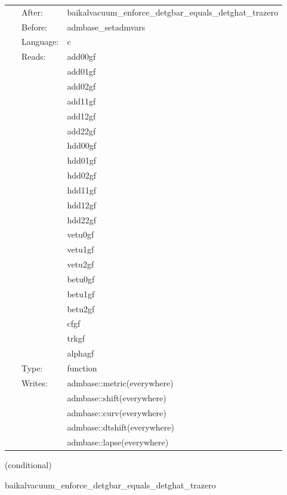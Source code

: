  \begin{tabular*}{160mm}{cll} 
~ & After:  & baikalvacuum\_enforce\_detgbar\_equals\_detghat\_trazero \\ 
~ & Before:  & admbase\_setadmvars \\ 
~ & Language:  & c \\ 
~ & Reads:  & add00gf \\ 
~& ~ &add01gf\\ 
~& ~ &add02gf\\ 
~& ~ &add11gf\\ 
~& ~ &add12gf\\ 
~& ~ &add22gf\\ 
~& ~ &hdd00gf\\ 
~& ~ &hdd01gf\\ 
~& ~ &hdd02gf\\ 
~& ~ &hdd11gf\\ 
~& ~ &hdd12gf\\ 
~& ~ &hdd22gf\\ 
~& ~ &vetu0gf\\ 
~& ~ &vetu1gf\\ 
~& ~ &vetu2gf\\ 
~& ~ &betu0gf\\ 
~& ~ &betu1gf\\ 
~& ~ &betu2gf\\ 
~& ~ &cfgf\\ 
~& ~ &trkgf\\ 
~& ~ &alphagf\\ 
~ & Type:  & function \\ 
~ & Writes:  & admbase::metric(everywhere) \\ 
~& ~ &admbase::shift(everywhere)\\ 
~& ~ &admbase::curv(everywhere)\\ 
~& ~ &admbase::dtshift(everywhere)\\ 
~& ~ &admbase::lapse(everywhere)\\ 
\end{tabular*} 


\vspace{5mm}

   (conditional) 

\hspace{5mm} baikalvacuum\_enforce\_detgbar\_equals\_detghat\_trazero 

\hspace{5mm}{\it project every updated bssn/fccz4 state before its next rhs } 


\hspace{5mm}

